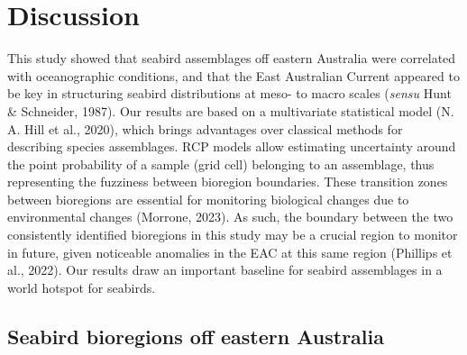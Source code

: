 \documentclass{article}
\begin{document}
\hypertarget{discussion}{%
\section{Discussion}\label{discussion}}

This study showed that seabird assemblages off eastern Australia were
correlated with oceanographic conditions, and that the East Australian
Current appeared to be key in structuring seabird distributions at meso-
to macro scales (\emph{sensu} Hunt \& Schneider, 1987). Our results are
based on a multivariate statistical model (N. A. Hill et al., 2020),
which brings advantages over classical methods for describing species
assemblages. RCP models allow estimating uncertainty around the point
probability of a sample (grid cell) belonging to an assemblage, thus
representing the fuzziness between bioregion boundaries. These
transition zones between bioregions are essential for monitoring
biological changes due to environmental changes (Morrone, 2023). As
such, the boundary between the two consistently identified bioregions in
this study may be a crucial region to monitor in future, given
noticeable anomalies in the EAC at this same region (Phillips et al.,
2022). Our results draw an important baseline for seabird assemblages in
a world hotspot for seabirds.

\hypertarget{seabird-bioregions-off-eastern-australia}{%
\subsection{Seabird bioregions off eastern
Australia}\label{seabird-bioregions-off-eastern-australia}}
\end{document}
